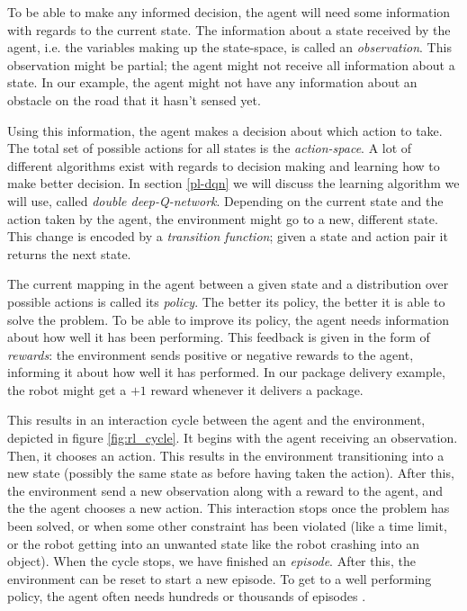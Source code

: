 To be able to make any informed decision, the agent will need some information with regards to the current state. The information about a state received by the agent, i.e. the variables making up the state-space, is called an \emph{observation}. This observation might be partial; the agent might not receive all information about a state. In our example, the agent might not have any information about an obstacle on the road that it hasn't sensed yet.

Using this information, the agent makes a decision  about which action to take. The total set of possible actions for all states is the \emph{action-space}. A lot of different algorithms exist with regards to decision making and learning how to make better decision. In section \ref{pl-dqn} we will discuss the learning algorithm we will use, called \emph{double deep-Q-network}. Depending on the current state and the action taken by the agent, the environment might go to a new, different state. This change is encoded by a \emph{transition function}; given a state and action pair it returns the next state. 

The current mapping in the agent between a given state and a distribution over possible actions is called its \emph{policy}. The better its policy, the better it is able to solve the problem. To be able to improve its policy, the agent needs information about how well it has been performing. This feedback is given in the form of \emph{rewards}: the environment sends positive or negative rewards to the agent, informing it about how well it has performed. In our package delivery example, the robot might get a $+1$ reward whenever it delivers a package.

This results in an interaction cycle between the agent and the environment, depicted in figure \ref{fig:rl_cycle}. It begins with the agent receiving an observation. Then, it chooses an action. This results in the environment transitioning into a new state (possibly the same state as before having taken the action). After this, the environment send a new observation along with a reward to the agent, and the the agent chooses a new action. This interaction stops once the problem has been solved, or when some other constraint has been violated (like a time limit, or the robot getting into an unwanted state like the robot crashing into an object). When the cycle stops, we have finished an \emph{episode}. After this, the environment can be reset to start a new episode. To get to a well performing policy, the agent often needs hundreds or thousands of episodes \cite[p. 6-10]{grokking}. 

